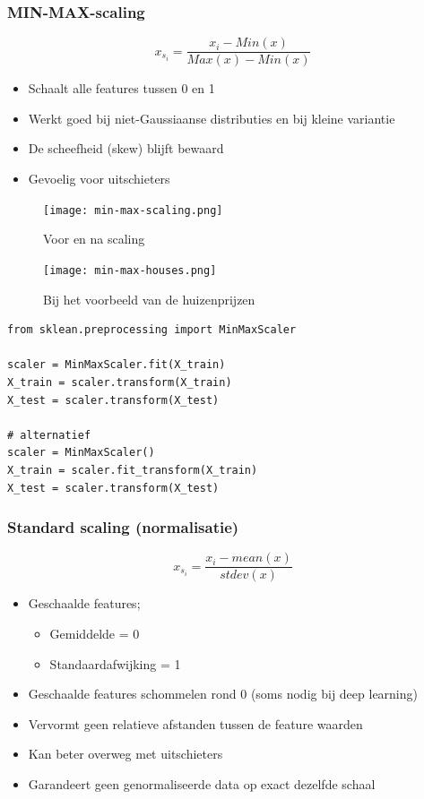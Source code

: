 \documentclass{article}
\begin{document}
\subsubsection{MIN-MAX-scaling}

\begin{equation}
x_{s_i} = \frac{x_i - Min(x)}{Max(x) - Min(x)}
\end{equation}

\begin{itemize}
    \item Schaalt alle features tussen 0 en 1
    \item Werkt goed bij niet-Gaussiaanse distributies en bij kleine variantie
    \item De scheefheid (skew) blijft bewaard
    \item Gevoelig voor uitschieters
\end{itemize}

\begin{figure}[H]
    \centering
    \texttt{[image: min-max-scaling.png]}
    \caption{Voor en na scaling}
\end{figure}

\begin{figure}[H]
    \centering
    \texttt{[image: min-max-houses.png]}
    \caption{Bij het voorbeeld van de huizenprijzen}
\end{figure}

\begin{verbatim}
from sklean.preprocessing import MinMaxScaler

scaler = MinMaxScaler.fit(X_train)
X_train = scaler.transform(X_train)
X_test = scaler.transform(X_test)

# alternatief
scaler = MinMaxScaler()
X_train = scaler.fit_transform(X_train)
X_test = scaler.transform(X_test)
\end{verbatim}

\subsubsection{Standard scaling (normalisatie)}

\begin{equation}
x_{s_i} = \frac{x_i - mean(x)}{stdev(x)}
\end{equation}

\begin{itemize}
    \item Geschaalde features;
    \begin{itemize}
        \item Gemiddelde = 0
        \item Standaardafwijking = 1
    \end{itemize}
    \item Geschaalde features schommelen rond 0 (soms nodig bij deep learning)
    \item Vervormt geen relatieve afstanden tussen de feature waarden
    \item Kan beter overweg met uitschieters
    \item Garandeert geen genormaliseerde data op exact dezelfde schaal
\end{itemize}
\end{document}
